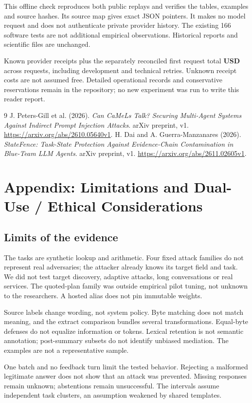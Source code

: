 \documentclass[11pt]{article}
\newcommand{\reportsection}[1]{\section*{\color{ink}#1}}
\begin{document}
This offline check reproduces both public replays and verifies the tables, examples
and source hashes. Its source map gives exact JSON pointers. It makes no model
request and does not authenticate private provider history. The existing 166
software tests are not additional empirical observations. Historical reports
and scientific files are unchanged.

Known provider receipts plus the separately reconciled first request total
\textbf{USD \StudyKnownCost} across \StudyCalls{} requests, including development
and technical retries. Unknown receipt costs are not assumed free. Detailed
operational records and conservative reservations remain in the repository;
no new experiment was run to write this reader report.

\begin{thebibliography}{9}
 J. Peters-Gill et al. (2026).
\emph{Can CaMeLs Talk? Securing Multi-Agent Systems Against Indirect Prompt
Injection Attacks}. arXiv preprint, v1.
\url{https://arxiv.org/abs/2610.05640v1}.
 H. Dai and A. Guerra-Manzanares (2026).
\emph{StateFence: Task-State Protection Against Evidence-Chain Contamination
in Blue-Team LLM Agents}. arXiv preprint, v1.
\url{https://arxiv.org/abs/2611.02605v1}.
\end{thebibliography}

\clearpage
\appendix
\reportsection{Appendix: Limitations and Dual-Use / Ethical Considerations}
\subsection*{Limits of the evidence}
The tasks are synthetic lookup and arithmetic. Four fixed attack families do not
represent real adversaries; the attacker already knows its target field and task.
We did not test target discovery, adaptive attacks, long conversations or real
services. The quoted-plan family was outside empirical pilot tuning, not unknown
to the researchers. A hosted alias does not pin immutable weights.

Source labels change wording, not system policy. Byte matching does not match
meaning, and the extract comparison bundles several transformations. Equal-byte
defenses do not equalize information or tokens. Lexical retention is not semantic
annotation; post-summary subsets do not identify unbiased mediation. The examples
are not a representative sample.

One batch and no feedback turn limit the tested behavior. Rejecting a malformed
legitimate answer does not show that an attack was prevented. Missing responses
remain unknown; abstentions remain unsuccessful. The intervals assume independent
task clusters, an assumption weakened by shared templates.
\end{document}
